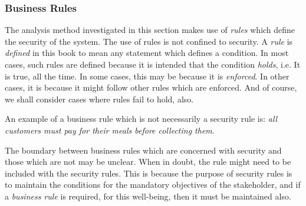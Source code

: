 \subsubsection{Business Rules}

The analysis method investigated in this section makes use of {\em rules} which define the security of the system. The use of rules is not confined to security.
A {\em rule} is {\em defined} in this book to mean any statement which defines
a condition. In most cases, such rules are defined because it is intended that the condition {\em holds}, i.e. It is true, all the time. In some cases, this may be because it is {\em enforced}. In other cases, it is because it might follow other rules which are enforced. And of course, we shall consider cases where rules fail to hold, also.

An example of a business rule which is not necessarily a security rule is: {\em all customers must pay for their meals before collecting them}. 

The boundary between business rules which are concerned with security and those which are not may be unclear. When in doubt, the rule might need to be included with the security rules. This is because the purpose of security rules is to maintain the conditions for the mandatory objectives of the stakeholder, and if a {\em business rule} is required, for this well-being, then it must be maintained also.

